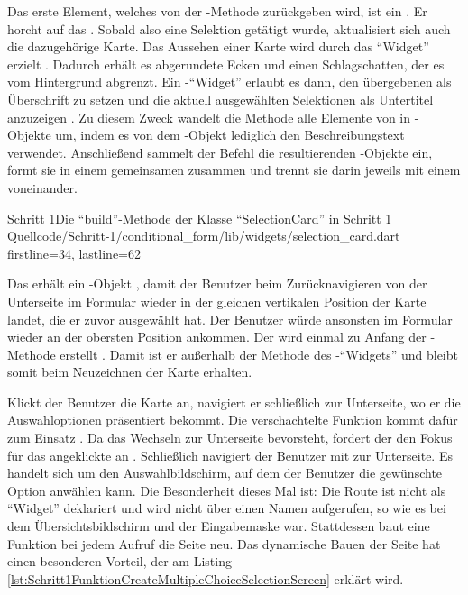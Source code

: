 Das erste Element, welches von der -Methode zurückgeben wird, ist ein  .
Er horcht auf das  .
Sobald also eine Selektion getätigt wurde, aktualisiert sich auch die dazugehörige Karte.
Das Aussehen einer Karte wird durch das \enquote{Widget}  erzielt .
Dadurch erhält es abgerundete Ecken und einen Schlagschatten, der es vom Hintergrund abgrenzt.
Ein -\enquote{Widget} erlaubt es dann, den übergebenen  als Überschrift zu setzen  und die aktuell ausgewählten Selektionen als Untertitel anzuzeigen .
Zu diesem Zweck wandelt die Methode  alle Elemente von  in -Objekte um, indem es von dem -Objekt lediglich den Beschreibungstext  verwendet.
Anschließend sammelt der Befehl  die resultierenden -Objekte ein, formt sie in einem gemeinsamen  zusammen und trennt sie darin jeweils mit einem  voneinander.

\begin{alexlisting}{Schritt 1}{Die \enquote{build}-Methode der Klasse \enquote{SelectionCard} in Schritt 1}
  {Quellcode/Schritt-1/conditional_form/lib/widgets/selection_card.dart}
  {firstline=34, lastline=62}
  \label{lst:Schritt1BuildMethodeDerSelectionCard}
\end{alexlisting}

Das  erhält ein -Objekt , damit der Benutzer beim Zurücknavigieren von der Unterseite im Formular wieder in der gleichen vertikalen Position der Karte landet, die er zuvor ausgewählt hat.
Der Benutzer würde ansonsten im Formular wieder an der obersten Position ankommen.
Der  wird einmal zu Anfang der -Methode erstellt .
Damit ist er außerhalb der Methode  des -\enquote{Widgets} und bleibt somit beim Neuzeichnen der Karte erhalten.


Klickt der Benutzer die Karte an, navigiert er schließlich zur Unterseite, wo er die Auswahloptionen präsentiert bekommt.
Die verschachtelte Funktion  kommt dafür zum Einsatz .
Da das Wechseln zur Unterseite bevorsteht, fordert der  den Fokus für das angeklickte  an .
Schließlich navigiert der Benutzer mit  zur Unterseite.
Es handelt sich um den Auswahlbildschirm, auf dem der Benutzer die gewünschte Option anwählen kann.
Die Besonderheit dieses Mal ist: Die Route ist nicht als \enquote{Widget} deklariert und wird nicht über einen Namen aufgerufen, so wie es bei dem Übersichtsbildschirm und der Eingabemaske war.
Stattdessen baut eine Funktion bei jedem Aufruf die Seite neu.
Das dynamische Bauen der Seite hat einen besonderen Vorteil, der am Listing \ref{lst:Schritt1FunktionCreateMultipleChoiceSelectionScreen} erklärt wird.







